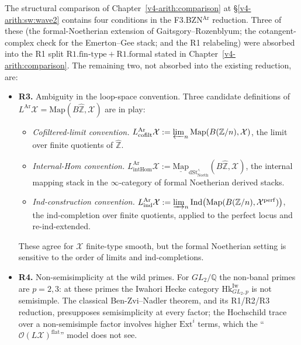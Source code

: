 The structural comparison of Chapter~\ref{v4-arith:comparison} at
\S\ref{v4-arith:sw:wave2} contains four conditions in the F3.BZN\({}^{\mathrm{Ar}}\)
reduction. Three of these (the formal-Noetherian
extension of Gaitsgory--Rozenblyum; the cotangent-complex check for
the Emerton--Gee stack; and the R1 relabeling) were absorbed into
the R1 split \(\mathrm{R1.fin\text{-}type}+\mathrm{R1.formal}\)
stated in Chapter~\ref{v4-arith:comparison}. The remaining two,
not absorbed into the existing reduction, are:
\begin{itemize}
\item \textbf{R3.} Ambiguity in the loop-space convention.
Three candidate definitions of
\(L^{\mathrm{Ar}}\mathcal{X}=\mathrm{Map}(B\widehat{\mathbb{Z}},\mathcal{X})\)
are in play:
\begin{itemize}
\item[\textbf{(a)}] \emph{Cofiltered-limit convention.}
\(L^{\mathrm{Ar}}_{\mathrm{cofilt}}\mathcal{X}:=\varprojlim_{n}\mathrm{Map}(B(\mathbb{Z}/n),\mathcal{X})\),
the limit over finite quotients of \(\widehat{\mathbb{Z}}\).
\item[\textbf{(b)}] \emph{Internal-Hom convention.}
\(L^{\mathrm{Ar}}_{\mathrm{intHom}}\mathcal{X}:=\underline{\mathrm{Map}}_{\mathrm{dSt}^{\wedge}_{\mathrm{Noeth}}}(B\widehat{\mathbb{Z}},\mathcal{X})\),
the internal mapping stack in the \(\infty\)-category of formal
Noetherian derived stacks.
\item[\textbf{(c)}] \emph{Ind-construction convention.}
\(L^{\mathrm{Ar}}_{\mathrm{ind}}\mathcal{X}:=\varinjlim_{n}\mathrm{Ind}\bigl(\mathrm{Map}(B(\mathbb{Z}/n),\mathcal{X}^{\mathrm{perf}})\bigr)\),
the ind-completion over finite quotients, applied to the perfect
locus and re-ind-extended.
\end{itemize}
These agree for \(\mathcal{X}\) finite-type smooth, but the formal
Noetherian setting is sensitive to the order of limits and
ind-completions.

\item \textbf{R4.} Non-semisimplicity at the wild primes.
For \(GL_{2}/\mathbb{Q}\) the non-banal primes are \(p=2,3\): at these
primes the Iwahori Hecke category
\(\mathrm{Hk}^{\mathrm{Iw}}_{GL_{2},p}\) is not semisimple. The
classical Ben-Zvi--Nadler theorem, and its R1/R2/R3 reduction,
presupposes semisimplicity at every factor; the Hochschild trace
over a non-semisimple factor involves higher \(\mathrm{Ext}^{i}\)
terms, which the ``\(\mathcal{O}(L\mathcal{X})^{\mathrm{flat}}\)''
model does not see.
\end{itemize}

